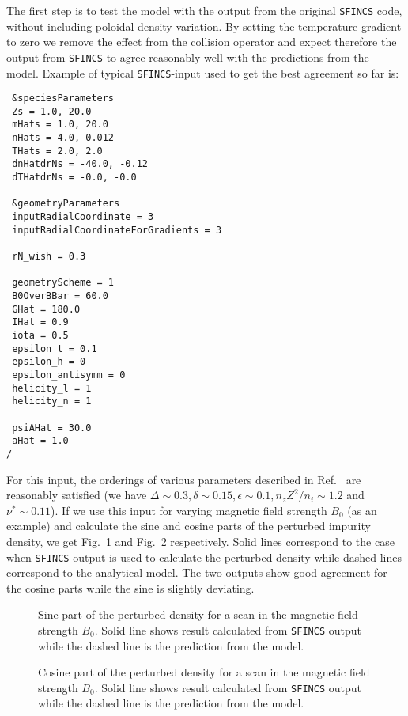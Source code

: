 \documentclass[12pt]{article}
\begin{document}

The first step is to test the model with the output from the original \texttt{SFINCS} code, without including poloidal density variation. By setting the temperature gradient to zero we remove the effect from the collision operator and expect therefore the output from \texttt{SFINCS} to agree reasonably well with the predictions from the model. Example of typical \texttt{SFINCS}-input used to get the best agreement so far is:
\newpage
 \begin{lstlisting}
 &speciesParameters
 Zs = 1.0, 20.0
 mHats = 1.0, 20.0
 nHats = 4.0, 0.012
 THats = 2.0, 2.0
 dnHatdrNs = -40.0, -0.12
 dTHatdrNs = -0.0, -0.0
 
 &geometryParameters
 inputRadialCoordinate = 3
 inputRadialCoordinateForGradients = 3

 rN_wish = 0.3

 geometryScheme = 1
 B0OverBBar = 60.0
 GHat = 180.0
 IHat = 0.9
 iota = 0.5
 epsilon_t = 0.1
 epsilon_h = 0
 epsilon_antisymm = 0
 helicity_l = 1
 helicity_n = 1

 psiAHat = 30.0
 aHat = 1.0
/
  \end{lstlisting}
\noindent
For this input, the orderings of various parameters described in Ref.~\cite{ref:Fulop} are reasonably satisfied (we have $\Delta\sim 0.3, \delta \sim 0.15, \epsilon \sim 0.1, n_zZ^2/n_i \sim 1.2$ and $\nu^*\sim 0.11$). If we use this input for varying magnetic field strength $B_0$ (as an example) and calculate the sine and cosine parts of the perturbed impurity density, we get Fig.~\ref{fig:1} and Fig.~\ref{fig:2} respectively. Solid lines correspond to the case when \texttt{SFINCS} output is used to calculate the perturbed density while dashed lines correspond to the analytical model. The two outputs show good agreement for the cosine parts while the sine is slightly deviating. 

\begin{figure}[H]
 \setlength\figureheight{0.3\textheight}
 \setlength{}
    \centering
    
    \caption{Sine part of the perturbed density for a scan in the magnetic field strength $B_0$. Solid line shows result calculated from \texttt{SFINCS} output while the dashed line is the prediction from the model.}
            \label{fig:1}
      \end{figure}  
  
  \begin{figure}[H]
 \setlength\figureheight{0.3\textheight}
 \setlength{}
    \centering
        
       \caption{Cosine part of the perturbed density for a scan in the magnetic field strength $B_0$. Solid line shows result calculated from \texttt{SFINCS} output while the dashed line is the prediction from the model.}
                  \label{fig:2}
  \end{figure}  
\end{document}
